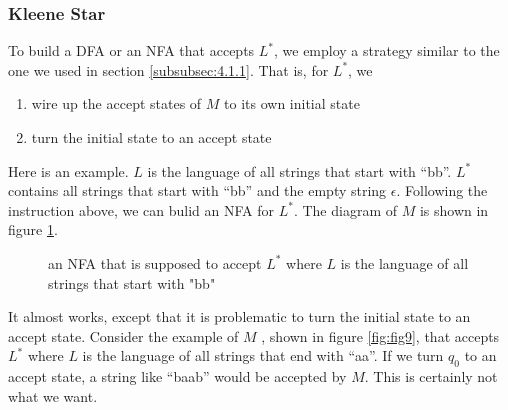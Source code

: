 \documentclass[11pt]{article}
\begin{document}
\subsubsection{Kleene Star}

To build a DFA or an NFA that accepts $L^\ast$, we employ a strategy
similar to the one we used in section \ref{subsubsec:4.1.1}. That is,
for $L^\ast$, we

\begin{enumerate}
\item wire up the accept states of $M$ to its own initial state
\item turn the initial state to an accept state
\end{enumerate}

Here is an example. $L$ is the language of all strings that start with ``bb''.
$L^\ast$ contains all strings that start with ``bb'' and the empty string $\epsilon$.
Following the instruction above, we can bulid an NFA for $L^\ast$. The diagram
of $M$ is shown in figure \ref{fig:fig8}.

\begin{figure}[ht]
    \centering
    \caption{an NFA that is supposed to accept $L^\ast$ where $L$ is the language
    of all strings that start with "bb"}
    \label{fig:fig8}
\end{figure}

It almost works, except that it is problematic to turn the initial state to an
accept state. Consider the example of $M$ , shown in figure \ref{fig:fig9},
that accepts $L^\ast$ where $L$ is the language of all strings that end with
``aa''. If we turn $q_0$ to an accept state, a string like ``baab'' would be
accepted by $M$. This is certainly not what we want.
\end{document}
